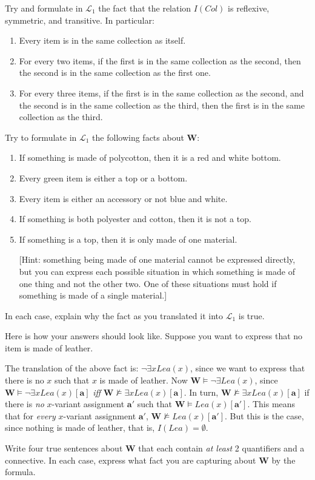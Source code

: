 \begin{exc}
Try and formulate in $\mathcal{L}_1$ the fact that the relation $I(Col)$ is reflexive, symmetric, and transitive. In particular:
\begin{enumerate}
	\item Every item is in the same collection as itself.
	\item For every two items, if the first is in the same collection as the second, then the second is in the same collection as the first one.
	\item For every three items, if the first is in the same collection as the second, and the second is in the same collection as the third, then the first is in the same collection as the third. 
\end{enumerate}
\end{exc}

\begin{exc}
Try to formulate in $\mathcal{L}_1$ the following facts about $\mathbf{W}$:
\begin{enumerate}
	\item If something is made of polycotton, then it is a red and white bottom. 
	\item Every green item is either a top or a bottom. 
	\item Every item is either an accessory or not blue and white. 
	\item If something is both polyester and cotton, then it is not a top. 
	\item If something is a top, then it is only made of one material. 
	
	[Hint: something being made of one material cannot be expressed directly, but you can express each possible situation in which something is made of one thing and not the other two. One of these situations must hold if something is made of a single material.]
\end{enumerate}

In each case, explain why the fact as you translated it into $\mathcal{L}_1$ is true.
\end{exc}

\begin{remark}
Here is how your answers should look like. Suppose you want to express that no item is made of leather. 

The translation of the above fact is: $\neg \exists x Lea(x)$, since we want to express that there is no $x$ such that $x$ is made of leather. Now $\mathbf{W}\models \neg \exists Lea(x)$, since $\mathbf{W} \models \neg \exists x Lea(x)[\mathbf{a}]$ \textit{iff} $\mathbf{W} \not\models \exists x Lea(x)[\mathbf{a}]$. In turn, $\mathbf{W} \not\models \exists x Lea(x)[\mathbf{a}]$ if there is \textit{no} $x$-variant assignment $\mathbf{a}'$ such that $\mathbf{W}\models Lea(x)[\mathbf{a}']$. This means that for \textit{every} $x$-variant assignment $\mathbf{a}'$, $\mathbf{W}\not\models Lea(x)[\mathbf{a}']$. But this is the case, since nothing is made of leather, that is, $I(Lea)=\emptyset$.
\end{remark}

\begin{exc}
Write four true sentences about $\mathbf{W}$ that each contain \textit{at least} 2 quantifiers and a connective. In each case, express what fact you are capturing about $\mathbf{W}$ by the formula. 
\end{exc}

